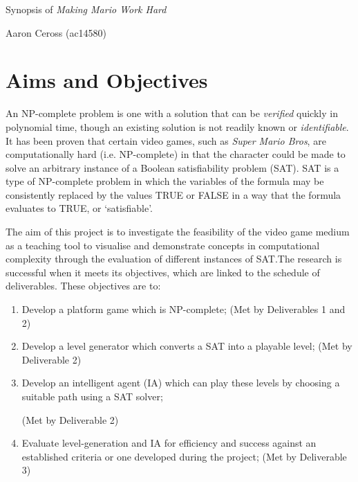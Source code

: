 \documentclass[a4paper]{article}
\begin{document}
\begin{center}\huge Synopsis of \textit{Making Mario Work Hard}
\par \Large Aaron Ceross (ac14580)
\end{center}
\vspace{-10mm}

\section{Aims and Objectives}
\vspace{-5mm}

An NP-complete problem is one with a solution that can be \textit{verified} quickly in polynomial time, though an existing solution is not readily known or \textit{identifiable}. It has been proven that certain video games, such as \textit{Super Mario Bros}, are computationally hard (i.e. NP-complete) in that the character could be made to solve an arbitrary instance of a Boolean satisfiability problem (SAT). SAT is a type of NP-complete problem in which the variables of the formula may be consistently replaced by the values TRUE or FALSE in a way that the formula evaluates to TRUE, or `satisfiable'. 

\par \noindent The aim of this project is to investigate the feasibility of the video game medium as a teaching tool to visualise and demonstrate concepts in computational complexity through the evaluation of different instances of SAT.\@ The research is successful when it meets its objectives, which are linked to the schedule of deliverables. These objectives are to:
\vspace{-3mm}
\begin{enumerate}
  \item Develop a platform game which is NP-complete; (Met by Deliverables 1 and 2) \vspace{-3mm}
  \item Develop a level generator which converts a SAT into a playable level; (Met by Deliverable 2)\vspace{-3mm} 
  \item Develop an intelligent agent (IA) which can play these levels by choosing a suitable path using a SAT solver;\vspace{-1mm} \par(Met by Deliverable 2)\vspace{-3mm}
  \item Evaluate level-generation and IA for efficiency and success against an established criteria or one developed during the project; \vspace{-1mm} (Met by Deliverable 3) \vspace{-3mm} 
\end{enumerate}
\vspace{-3mm}
\end{document}

